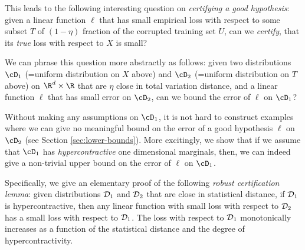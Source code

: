 This leads to the following interesting question on \emph{certifying a good hypothesis}: given a linear function $\ell$ that has small empirical loss with respect to some subset $T$ of $(1-\eta)$ fraction of the corrupted training set $U$, can we {\em certify}, that its {\em true} loss with respect to $X$ is small?

We can phrase this question more abstractly as follows: given two distributions $\cD_1$ (=uniform distribution on $X$ above) and $\cD_2$ (=uniform distribution on $T$ above) on $\R^d \times \R$ that are $\eta$ close in total variation distance, and a linear function $\ell$ that has small error on $\cD_2$, can we bound the error of $\ell$ on $\cD_1$? 

Without making any assumptions on $\cD_1$, it is not hard to construct examples where we can give no meaningful bound on the error of a good hypothesis $\ell$ on $\cD_2$ (see Section \ref{sec:lower-bounds}). More excitingly, we show that if we assume that $\cD_1$ has \emph{hypercontractive} one dimensional marginals, then, we can indeed give a non-trivial upper bound on the error of $\ell$ on $\cD_1$. 



Specifically, we give an elementary proof of the following
\emph{robust certification lemma}: given distributions ${\cal D}_1$ and ${\cal D}_2$ that
are close in statistical distance, if ${\cal D}_1$ is
hypercontractive, then any linear function with small loss with
respect to ${\cal D}_2$ has a small loss with respect to
${\cal D}_1$. The loss with respect to ${\cal D}_1$ monotonically increases as a
function of the statistical distance and the degree of hypercontractivity.


